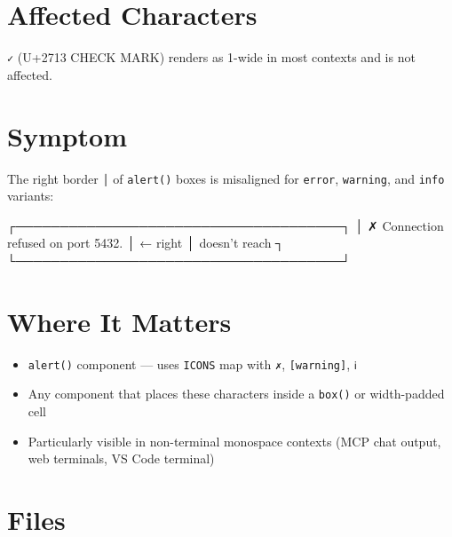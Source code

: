 \section{Affected Characters}\label{record-402-affected-characters}



\texttt{✓} (U+2713 CHECK MARK) renders as 1-wide in most contexts and is not affected.

\section{Symptom}\label{record-402-symptom}

The right border \texttt{│} of \texttt{a\allowbreak{}l\allowbreak{}e\allowbreak{}r\allowbreak{}t\allowbreak{}(\allowbreak{})} boxes is misaligned for \texttt{e\allowbreak{}r\allowbreak{}r\allowbreak{}o\allowbreak{}r}, \texttt{w\allowbreak{}a\allowbreak{}r\allowbreak{}n\allowbreak{}i\allowbreak{}n\allowbreak{}g}, and \texttt{i\allowbreak{}n\allowbreak{}f\allowbreak{}o} variants:

\begin{CodeBlock}
┌─────────────────────────────────────┐
│ ✗ Connection refused on port 5432. │   ← right │ doesn't reach ┐
└─────────────────────────────────────┘
\end{CodeBlock}

\section{Where It Matters}\label{record-402-where-it-matters}

\begin{itemize}
\tightlist
\item
  \texttt{a\allowbreak{}l\allowbreak{}e\allowbreak{}r\allowbreak{}t\allowbreak{}(\allowbreak{})} component --- uses \texttt{I\allowbreak{}C\allowbreak{}O\allowbreak{}N\allowbreak{}S} map with \texttt{✗}, \texttt{[\allowbreak{}w\allowbreak{}a\allowbreak{}r\allowbreak{}n\allowbreak{}i\allowbreak{}n\allowbreak{}g\allowbreak{}]}, \texttt{ℹ}
\item
  Any component that places these characters inside a \texttt{b\allowbreak{}o\allowbreak{}x\allowbreak{}(\allowbreak{})} or width-padded cell
\item
  Particularly visible in non-terminal monospace contexts (MCP chat output, web terminals, VS Code terminal)
\end{itemize}

\section{Files}\label{record-402-files}

